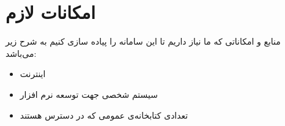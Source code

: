 \chapter{امکانات لازم }

منابع و امکاناتی که ما نیاز داریم تا این سامانه را پیاده سازی کنیم به شرح زیر می‌باشد:

\begin{itemize}
    \item اینترنت
    \item سیستم شخصی جهت توسعه نرم افزار
    \item تعدادی کتابخانه‌ی عمومی که در دسترس هستند
\end{itemize}